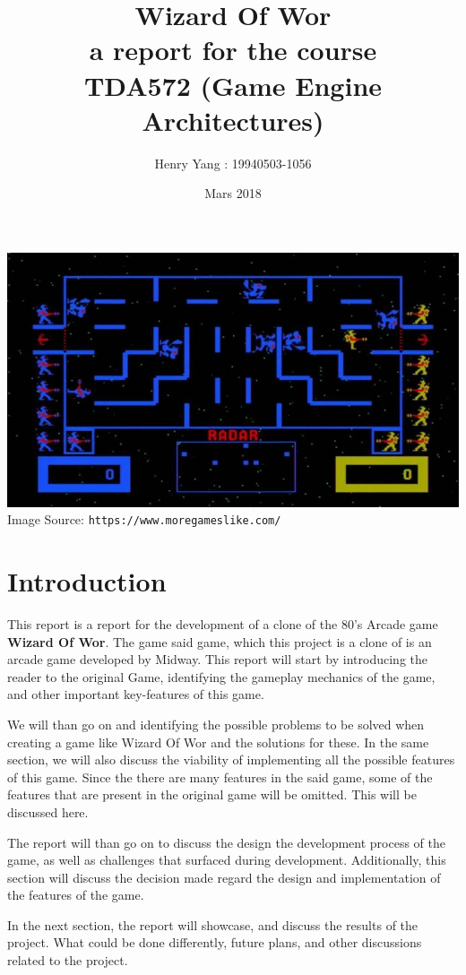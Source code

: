 \documentclass{article}
\author{Henry Yang : 19940503-1056}
\title{Wizard Of Wor \\\large a report for the course \\TDA572 (Game Engine Architectures)}
\date{Mars 2018}
\begin{document}
  \maketitle
  \includegraphics[scale=0.4]{assets/lateximg/WizardOfWor}\\
  Image Source: \texttt{https://www.moregameslike.com/}
  \section{Introduction}

  This report is a report for the development of a clone of the 80's Arcade game \textbf{Wizard Of Wor}. The game said game, which this project is a clone of is an arcade game developed by Midway. This report will start by introducing the reader to the original Game, identifying the gameplay mechanics of the game, and other important key-features of this game.

  We will than go on and identifying the possible problems to be solved when creating a game like Wizard Of Wor and the solutions for these. In the same section, we will also discuss the viability of implementing all the possible features of this game. Since the there are many features in the said game, some of the features that are present in the original game will be omitted. This will be discussed here.

  The report will than go on to discuss the design the development process of the game, as well as challenges that surfaced during development. Additionally, this section will discuss the decision made regard the design and implementation of the features of the game.

  In the next section, the report will showcase, and discuss the results of the project. What could be done differently, future plans, and other discussions related to the project.
\end{document}

